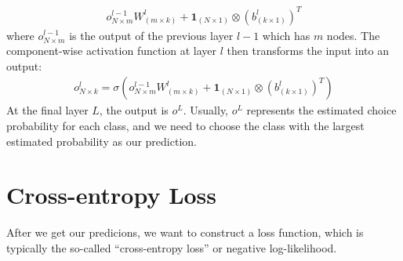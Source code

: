 \documentclass[letterpaper,12pt]{article}
\begin{document}
\begin{align}
o^{l-1}_{N\times m}W^l_{(m\times k)} + \boldsymbol{1}_{(N\times 1)}\otimes(b^l_{(k\times 1)})^T
\end{align}
where $o^{l-1}_{N\times m}$ is the output of the previous layer $l-1$ which has $m$ nodes. The component-wise activation function at layer $l$ then transforms the input into an output:
\begin{align}
o^{l}_{N\times k} = \sigma\left( o^{l-1}_{N\times m}W^l_{(m\times k)} + \boldsymbol{1}_{(N\times 1)}\otimes(b^l_{(k\times 1)})^T \right)
\end{align}
At the final layer $L$, the output is $o^L$. Usually, $o^L$ represents the estimated choice probability for each class, and we need to choose the class with the largest estimated probability as our prediction.

\section{Cross-entropy Loss}
After we get our predicions, we want to construct a loss function, which is typically the so-called ``cross-entropy loss'' or negative log-likelihood.
\end{document}
